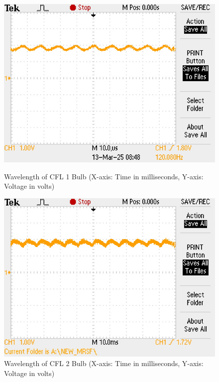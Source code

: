 \documentclass[12pt]{article}
\begin{document}
\begin{figure}[H]
    \centering
    \begin{minipage}{0.45\textwidth}
        \centering
        \includegraphics[width=\textwidth]{CFL 1 Graph.jpg}
        \caption{Wavelength of CFL 1 Bulb (X-axis: Time in milliseconds, Y-axis: Voltage in volts)}
        \label{fig:cfl1}
        \end{minipage}
        \hfill
        \begin{minipage}{0.45\textwidth}
        \centering
        \includegraphics[width=\textwidth]{CFL 2 Graph.jpg}
        \caption{Wavelength of CFL 2 Bulb (X-axis: Time in milliseconds, Y-axis: Voltage in volts)}
        \label{fig:cfl2}
        \end{minipage}

\end{figure}
\end{document}
